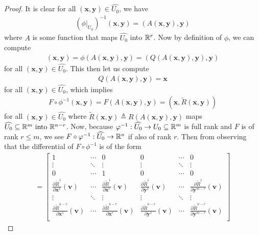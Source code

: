 \documentclass{report}
\begin{document}
\begin{proof}
 It is clear for all $(\textbf{x},\textbf{y})\in \widehat{U_0}$, we have  
\begin{align*}
  (\phi|_{U_0})^{-1}(\textbf{x},\textbf{y})= (A(\textbf{x},\textbf{y}),\textbf{y})
\end{align*}
 where $A$ is some function that maps $\widehat{U_0}$ into $\mathbb{R}^r$. Now by definition of $\phi$, we can compute 
\begin{align*}
  (\textbf{x},\textbf{y})=\phi (A(\textbf{x},\textbf{y}),\textbf{y})= (Q(A(\textbf{x},\textbf{y}),\textbf{y}),\textbf{y})
\end{align*}
for all $(\textbf{x},\textbf{y})\in \widehat{U_0}$. This then let us compute
\begin{align*}
 Q(A(\textbf{x},\textbf{y}),\textbf{y})=\textbf{x} 
\end{align*}
for all $(\textbf{x},\textbf{y})\in \widehat{U_0}$, which implies  
\begin{align*}
F\circ \phi^{-1}(\textbf{x},\textbf{y})=F (A(\textbf{x},\textbf{y}),\textbf{y})= (\textbf{x},\tilde{R}(\textbf{x},\textbf{y}))
\end{align*}
for all $(\textbf{x},\textbf{y})\in \widehat{U_0}$ where $\tilde{R}(\textbf{x},\textbf{y})\triangleq R(A(\textbf{x},\textbf{y}),\textbf{y})$ maps $\widehat{U_0}\subseteq \mathbb{R}^m\text{ into }\mathbb{R}^{n-r}$. Now, because $\varphi^{-1}:\widehat{U_0}\rightarrow U_0 \subseteq \mathbb{R}^m$ is full rank and $F$ is of rank  $r\leq m$, we see $F\circ \varphi^{-1}:\widehat{U_0}\rightarrow \mathbb{R}^n$ if also of rank $r$. Then from observing that the differential of  $F\circ \phi ^{-1}$ is of the form 
\begin{align*}
[d(F\circ \phi^{-1})_{\textbf{v}}]=\begin{bmatrix} 
  1 & \cdots & 0 & 0 & \cdots & 0 \\
  \vdots & \ddots & \vdots & \vdots & \ddots & \vdots \\
  0 & \cdots & 1 & 0 & \cdots & 0  \\
  \frac{\partial \tilde{R}^1 }{\partial \textbf{x}^1}(\textbf{v}) & \cdots & \frac{\partial \tilde{R}^1 }{\partial  \textbf{x}^r}(\textbf{v}) & \frac{\partial \tilde{R}^1 }{\partial  \textbf{y}^1}(\textbf{v}) & \cdots &\frac{\partial \tilde{R}^1 }{\partial  \textbf{y}^{m-r}}(\textbf{v}) \\
  \vdots & \ddots & \vdots & \vdots & \ddots & \vdots \\
  \frac{\partial \tilde{R}^{n-r} }{\partial \textbf{x}^1}(\textbf{v}) & \cdots & \frac{\partial \tilde{R}^{n-r} }{\partial  \textbf{x}^r}(\textbf{v}) & \frac{\partial \tilde{R}^{n-r} }{\partial  \textbf{y}^1}(\textbf{v}) & \cdots & \frac{\partial \tilde{R}^{n-r} }{\partial  \textbf{y}^{m-r}}(\textbf{v}) \\

\end{bmatrix}
\end{align*}
\end{proof}
\end{document}
